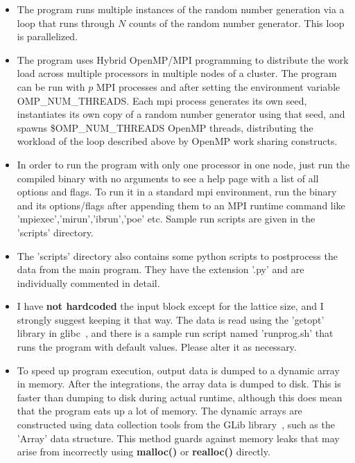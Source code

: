 \documentclass[a4paper,10pt]{article}
\begin{document}
\begin{itemize}
\item
 The program runs multiple instances of the random number generation via a loop that runs through $N$ counts of the random number generator. This loop is parallelized.
\item
 The program uses Hybrid OpenMP/MPI programming to distribute the work load across multiple processors in multiple nodes of a cluster.  The program can be run with $p$ MPI processes and after setting the environment variable OMP\_NUM\_THREADS. Each mpi process generates its own seed, instantiates its own copy of a random number generator using that seed, and spawns \$OMP\_NUM\_THREADS OpenMP threads, distributing the workload of the loop described above by OpenMP work sharing constructs. 
\item
In order to run the program with only one processor in one node, just run the compiled binary with no arguments to see a help page with a list of all options and flags. To run it in a standard mpi environment, run the binary and its options/flags after appending them to an MPI runtime command like 'mpiexec','mirun','ibrun','poe' etc. Sample run scripts are given in the 'scripts' directory.
\item
The 'scripts' directory also contains some python scripts to postprocess the data from the main program. They have the extension '.py' and are individually commented in detail.
  \item 
  I have \textbf{not hardcoded} the input block except for the lattice size, and I strongly suggest keeping it that way. The data is read using the 'getopt' library in glibc~\cite{getopt}, and there is a sample run script named 'runprog.sh' that runs the program with default values. Please alter it as necessary.
 \item
 To speed up program execution, output data is dumped to a dynamic array in memory. After the integrations, the array data is dumped to disk. This is faster than dumping to disk during actual runtime, although this does mean that the program eats up a lot of memory. The dynamic arrays are constructed using data collection tools from the GLib library~\cite{glib}, such as the 'Array' data structure. This method guards against memory leaks that may arise from incorrectly using \textbf{malloc()} or \textbf{realloc()} directly.
\end{itemize}
\end{document}
